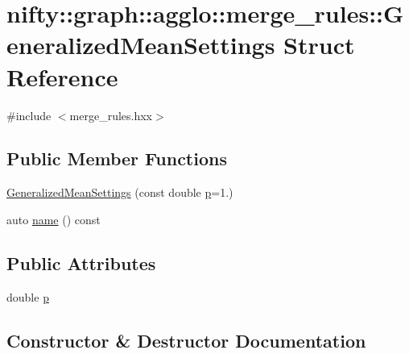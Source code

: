 \hypertarget{structnifty_1_1graph_1_1agglo_1_1merge__rules_1_1GeneralizedMeanSettings}{}\section{nifty\+:\+:graph\+:\+:agglo\+:\+:merge\+\_\+rules\+:\+:Generalized\+Mean\+Settings Struct Reference}
\label{structnifty_1_1graph_1_1agglo_1_1merge__rules_1_1GeneralizedMeanSettings}


{\ttfamily \#include $<$merge\+\_\+rules.\+hxx$>$}

\subsection*{Public Member Functions}
\begin{DoxyCompactItemize}
\item 
\hyperlink{structnifty_1_1graph_1_1agglo_1_1merge__rules_1_1GeneralizedMeanSettings_a3015695e0ac1359d084862e2e2ef0aad}{Generalized\+Mean\+Settings} (const double \hyperlink{structnifty_1_1graph_1_1agglo_1_1merge__rules_1_1GeneralizedMeanSettings_ae5f516b4cf360295f9507cc40145edca}{p}=1.)
\item 
auto \hyperlink{structnifty_1_1graph_1_1agglo_1_1merge__rules_1_1GeneralizedMeanSettings_a7798d9bba6a2118710bd80d731f915cf}{name} () const
\end{DoxyCompactItemize}
\subsection*{Public Attributes}
\begin{DoxyCompactItemize}
\item 
double \hyperlink{structnifty_1_1graph_1_1agglo_1_1merge__rules_1_1GeneralizedMeanSettings_ae5f516b4cf360295f9507cc40145edca}{p}
\end{DoxyCompactItemize}


\subsection{Constructor \& Destructor Documentation}
\mbox{\label{structnifty_1_1graph_1_1agglo_1_1merge__rules_1_1GeneralizedMeanSettings_a3015695e0ac1359d084862e2e2ef0aad}} 
